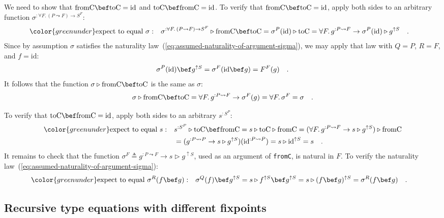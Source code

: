 We need to show that $\text{fromC}\bef\text{toC}=\text{id}$ and $\text{toC}\bef\text{fromC}=\text{id}$.
To verify that $\text{fromC}\bef\text{toC}=\text{id}$, apply both
sides to an arbitrary function $\sigma^{:\forall F.\,(P\leadsto F)\rightarrow S^{F}}$:
\begin{align*}
{\color{greenunder}\text{expect to equal }\sigma:}\quad & \sigma^{:\forall F.\,(P\leadsto F)\rightarrow S^{F}}\triangleright\text{fromC}\bef\text{toC}=\sigma^{P}(\text{id})\triangleright\text{toC}=\forall F.\,g^{:P\leadsto F}\rightarrow\sigma^{P}(\text{id})\triangleright g^{\uparrow S}\quad.
\end{align*}
Since by assumption $\sigma$ satisfies the naturality law~(\ref{eq:assumed-naturality-of-argument-sigma}),
we may apply that law with $Q=P$, $R=F$, and $f=\text{id}$:
\[
\sigma^{P}(\text{id})\bef g^{\uparrow S}=\sigma^{F}(\text{id}\bef g)=F^{F}(g)\quad.
\]
It follows that the function $\sigma\triangleright\text{fromC}\bef\text{toC}$
is the same as $\sigma$:
\[
\sigma\triangleright\text{fromC}\bef\text{toC}=\forall F.\,g^{:P\leadsto F}\rightarrow\sigma^{F}(g)=\forall F.\,\sigma^{F}=\sigma\quad.
\]

To verify that $\text{toC}\bef\text{fromC}=\text{id}$, apply both
sides to an arbitrary $s^{:S^{P}}$:
\begin{align*}
{\color{greenunder}\text{expect to equal }s:}\quad & s^{:S^{P}}\triangleright\text{toC}\bef\text{fromC}=s\triangleright\text{toC}\triangleright\text{fromC}=(\forall F.\,g^{:P\leadsto F}\rightarrow s\triangleright g^{\uparrow S})\triangleright\text{fromC}\\
 & =(g^{:P\leadsto P}\rightarrow s\triangleright g^{\uparrow S})(\text{id}^{:P\leadsto P})=s\triangleright\text{id}^{\uparrow S}=s\quad.
\end{align*}
It remains to check that the function $\sigma^{F}\triangleq g^{:P\leadsto F}\rightarrow s\triangleright g^{\uparrow S}$,
used as an argument of \lstinline!fromC!,
is natural in $F$. To verify the naturality law~(\ref{eq:assumed-naturality-of-argument-sigma}):
\begin{align*}
{\color{greenunder}\text{expect to equal }\sigma^{R}(f\bef g):}\quad & \sigma^{Q}(f)\bef g^{\uparrow S}=s\triangleright f^{\uparrow S}\bef g^{\uparrow S}=s\triangleright(f\bef g)^{\uparrow S}=\sigma^{R}(f\bef g)\quad.
\end{align*}


\subsection{Recursive type equations with different fixpoints}

